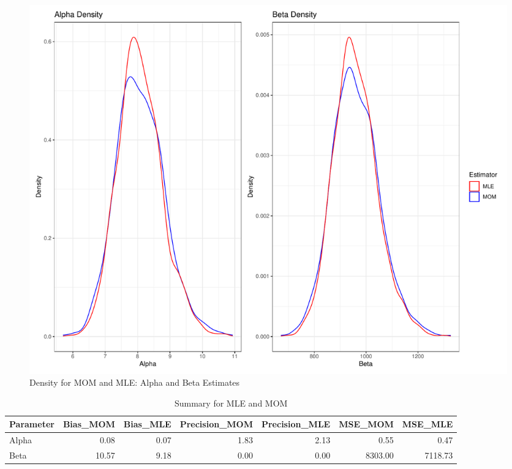 \documentclass{article}\usepackage[]{graphicx}\usepackage[]{xcolor}
\makeatletter
\def\maxwidth{ %
  \ifdim\Gin@nat@width>\linewidth
    \linewidth
  \else
    \Gin@nat@width
  \fi
}
\newenvironment{knitrout}{}{} %
\makeatother
\begin{document}
\begin{figure}[H]
\begin{center}
\begin{knitrout}
\color{fgcolor}

{\centering \includegraphics[width=\maxwidth]{figure/unnamed-chunk-13-1} 

}


\end{knitrout}
\caption{Density for MOM and MLE: Alpha and Beta Estimates}
\label{plot6} 
\end{center}
\end{figure}
\begin{table}[H]
\centering
\begingroup\small
\begin{tabular}{lrrrrrr}
  \hline
Parameter & Bias\_MOM & Bias\_MLE & Precision\_MOM & Precision\_MLE & MSE\_MOM & MSE\_MLE \\ 
  \hline
Alpha & 0.08 & 0.07 & 1.83 & 2.13 & 0.55 & 0.47 \\ 
  Beta & 10.57 & 9.18 & 0.00 & 0.00 & 8303.00 & 7118.73 \\ 
   \hline
\end{tabular}
\endgroup
\caption{Summary for MLE and MOM} 
\label{Table 5}
\end{table}
\end{document}

